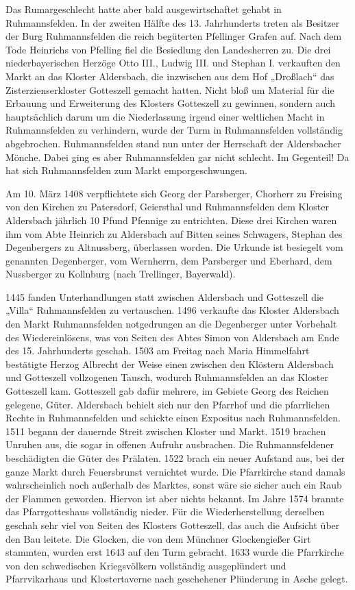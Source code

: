 \documentclass[12pt,a4paper]{book}
\begin{document}
Das Rumargeschlecht hatte aber bald ausgewirtschaftet gehabt in
Ruhmannsfelden. In der zweiten Hälfte des 13. Jahrhunderts treten als
Besitzer der Burg Ruhmannsfelden die reich begüterten Pfellinger Grafen
auf. Nach dem Tode Heinrichs von Pfelling fiel die Besiedlung den
Landesherren zu. Die drei niederbayerischen Herzöge Otto III., Ludwig
III. und Stephan I. verkauften den Markt an das Kloster Aldersbach, die
inzwischen aus dem Hof „Droßlach“ das Zisterzienserkloster Gotteszell
gemacht hatten. Nicht bloß um Material für die Erbauung und Erweiterung
des Klosters Gotteszell zu gewinnen, sondern auch hauptsächlich darum um
die Niederlassung irgend einer weltlichen Macht in Ruhmannsfelden zu
verhindern, wurde der Turm in Ruhmannsfelden vollständig abgebrochen.
Ruhmannsfelden stand nun unter der Herrschaft der Aldersbacher Mönche.
Dabei ging es aber Ruhmannsfelden gar nicht schlecht. Im Gegenteil! Da
hat sich Ruhmannsfelden zum Markt emporgeschwungen.

Am 10. März 1408 verpflichtete sich Georg der Parsberger, Chorherr zu
Freising von den Kirchen zu Patersdorf, Geiersthal und Ruhmannsfelden
dem Kloster Aldersbach jährlich 10 Pfund Pfennige zu entrichten. Diese
drei Kirchen waren ihm vom Abte Heinrich zu Aldersbach auf Bitten seines
Schwagers, Stephan des Degenbergers zu Altnussberg, überlassen worden.
Die Urkunde ist besiegelt vom genannten Degenberger, vom Wernherrn, dem
Parsberger und Eberhard, dem Nussberger zu Kollnburg (nach Trellinger,
Bayerwald).

1445 fanden Unterhandlungen statt zwischen Aldersbach und Gotteszell die
„Villa“ Ruhmannsfelden zu vertauschen. 1496 verkaufte das Kloster
Aldersbach den Markt Ruhmannsfelden notgedrungen an die Degenberger
unter Vorbehalt des Wiedereinlösens, was von Seiten des Abtes Simon von
Aldersbach am Ende des 15. Jahrhunderts geschah. 1503 am Freitag nach
Maria Himmelfahrt bestätigte Herzog Albrecht der Weise einen zwischen
den Klöstern Aldersbach und Gotteszell vollzogenen Tausch, wodurch
Ruhmannsfelden an das Kloster Gotteszell kam. Gotteszell gab dafür
mehrere, im Gebiete Georg des Reichen gelegene, Güter. Aldersbach
behielt sich nur den Pfarrhof und die pfarrlichen Rechte in
Ruhmannsfelden und schickte einen Expositus nach Ruhmannsfelden. 1511
begann der dauernde Streit zwischen Kloster und Markt. 1519 brachen
Unruhen aus, die sogar in offenen Aufruhr ausbrachen. Die
Ruhmannsfeldener beschädigten die Güter des Prälaten. 1522 brach ein
neuer Aufstand aus, bei der ganze Markt durch Feuersbrunst vernichtet
wurde. Die Pfarrkirche stand damals wahrscheinlich noch außerhalb des
Marktes, sonst wäre sie sicher auch ein Raub der Flammen geworden.
Hiervon ist aber nichts bekannt. Im Jahre 1574 brannte das
Pfarrgotteshaus vollständig nieder. Für die Wiederherstellung derselben
geschah sehr viel von Seiten des Klosters Gotteszell, das auch die
Aufsicht über den Bau leitete. Die Glocken, die von dem Münchner
Glockengießer Girt stammten, wurden erst 1643 auf den Turm gebracht.
1633 wurde die Pfarrkirche von den schwedischen Kriegsvölkern
vollständig ausgeplündert und Pfarrvikarhaus und Klostertaverne nach
geschehener Plünderung in Asche gelegt.
\end{document}
